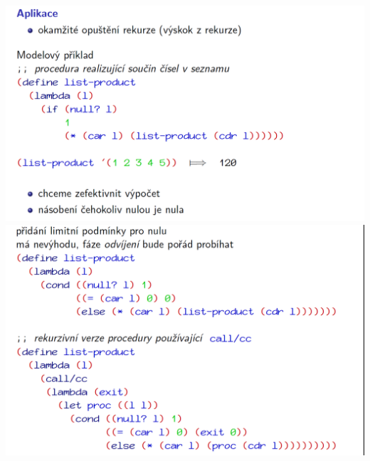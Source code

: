 \documentclass[10pt,a4paper]{article}
\begin{document}
\begin{center}
	\includegraphics[scale=0.31]{img/aktualni_pokracovani_12}
	\includegraphics[scale=0.31]{img/aktualni_pokracovani_13}
\end{center}
\end{document}
